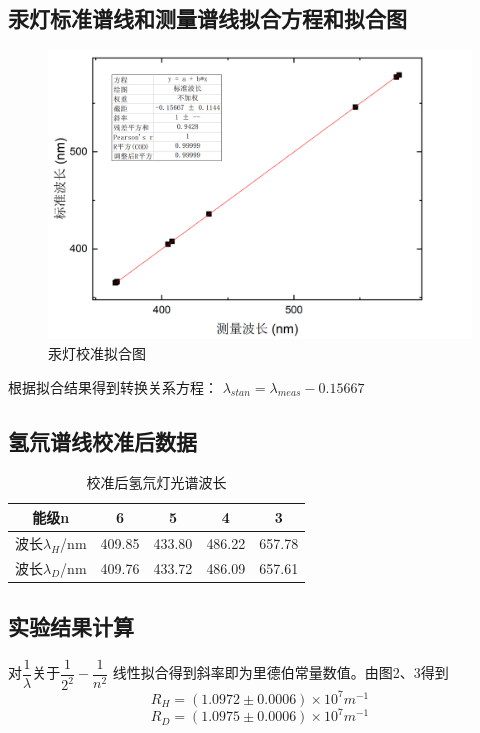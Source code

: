 \documentclass{report}
\begin{document}
\subsection{汞灯标准谱线和测量谱线拟合方程和拟合图}
 \begin{figure}
	\centering
	\includegraphics[scale=0.12]{汞灯拟合}
	\caption{\heiti{}汞灯校准拟合图}
	
\end{figure}
根据拟合结果得到转换关系方程：
$ \lambda_{stan}=\lambda_{meas}-0.15667 $
\subsection{氢氘谱线校准后数据}
	\begin{table}[!h]
	\centering
	\caption{\heiti{}校准后氢氘灯光谱波长}
	\begin{tabular}{|c|c|c|c|c|}
	
	\hline
	能级n&6&5&4&3\\
	\hline
	波长$ \lambda_H $/nm&409.85&433.80&486.22&657.78\\
	\hline

	波长$ \lambda_D $/nm&409.76&433.72&486.09&657.61\\
	\hline


\end{tabular}
\end{table}
\subsection{实验结果计算}
对$ \dfrac{1}{\lambda} $关于$ \dfrac{1}{2^2}-\dfrac{1}{n^2} $ 线性拟合得到斜率即为里德伯常量数值。由图2、3得到
\begin{equation}
	R_H=(1.0972\pm0.0006)\times10^7 m^{-1}  \nonumber
\end{equation}
\begin{equation}
	R_D=(1.0975\pm0.0006)\times10^7 m^{-1}  \nonumber
\end{equation}
\end{document}
